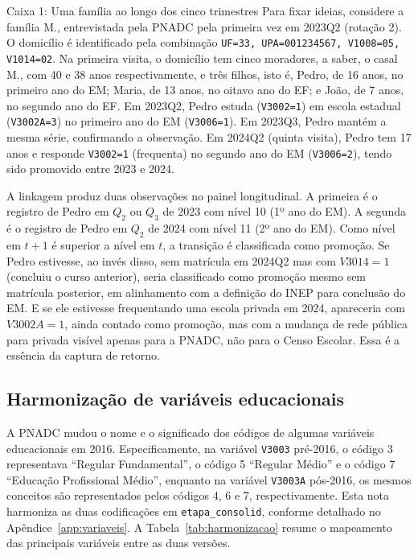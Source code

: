 \begin{caixatexto}{Caixa 1: Uma família ao longo dos cinco trimestres}
Para fixar ideias, considere a família M., entrevistada pela PNADC
pela primeira vez em 2023Q2 (rotação 2). O domicílio é identificado
pela combinação \texttt{UF=33, UPA=001234567, V1008=05, V1014=02}.
Na primeira visita, o domicílio tem cinco moradores, a saber, o
casal M., com 40 e 38 anos respectivamente, e três filhos, isto é,
Pedro, de 16 anos, no primeiro ano do EM; Maria, de 13 anos, no
oitavo ano do EF; e João, de 7 anos, no segundo ano do EF. Em
2023Q2, Pedro estuda (\texttt{V3002=1}) em escola estadual
(\texttt{V3002A=3}) no primeiro ano do EM (\texttt{V3006=1}). Em
2023Q3, Pedro mantém a mesma série, confirmando a observação. Em
2024Q2 (quinta visita), Pedro tem 17 anos e responde
\texttt{V3002=1} (frequenta) no segundo ano do EM
(\texttt{V3006=2}), tendo sido promovido entre 2023 e 2024.

A linkagem produz duas observações no painel longitudinal. A
primeira é o registro de Pedro em $Q_2$ ou $Q_3$ de 2023 com
nível 10 (1º ano do EM). A segunda é o registro de Pedro em
$Q_2$ de 2024 com nível 11 (2º ano do EM). Como nível em $t+1$ é
superior a nível em $t$, a transição é classificada como
promoção. Se Pedro estivesse, ao invés disso, sem matrícula em
2024Q2 mas com $V3014=1$ (concluiu o curso anterior), seria
classificado como promoção mesmo sem matrícula posterior, em
alinhamento com a definição do INEP para conclusão do EM. E se
ele estivesse frequentando uma escola privada em 2024, apareceria
com $V3002A=1$, ainda contado como promoção, mas com a mudança de
rede pública para privada visível apenas para a PNADC, não para
o Censo Escolar. Essa é a essência da captura de retorno.
\end{caixatexto}

\subsection{Harmonização de variáveis educacionais}

A PNADC mudou o nome e o significado dos códigos de algumas
variáveis educacionais em 2016. Especificamente, na variável
\texttt{V3003} pré-2016, o código 3 representava ``Regular
Fundamental'', o código 5 ``Regular Médio'' e o código 7
``Educação Profissional Médio'', enquanto na variável
\texttt{V3003A} pós-2016, os mesmos conceitos são representados
pelos códigos 4, 6 e 7, respectivamente. Esta nota harmoniza as
duas codificações em \texttt{etapa\_consolid}, conforme detalhado
no Apêndice~\ref{app:variaveis}. A Tabela~\ref{tab:harmonizacao}
resume o mapeamento das principais variáveis entre as duas versões.


